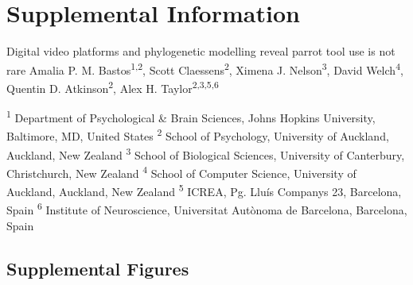 \documentclass[
  man, donotrepeattitle,floatsintext]{apa6}
\begin{document}
\renewcommand{\figurename}{Figure}
\renewcommand{\tablename}{Table}
\renewcommand{\thefigure}{S\arabic{figure}} \setcounter{figure}{0}
\renewcommand{\thetable}{S\arabic{table}} \setcounter{table}{0}
\renewcommand{\theequation}{S\arabic{equation}} \setcounter{equation}{0}

\hypertarget{supplemental-information}{%
\section{\texorpdfstring{\textbf{Supplemental Information}}{Supplemental Information}}\label{supplemental-information}}

\setcounter{page}{1}
\centering

\noindent \hspace*{5mm} \small Digital video platforms and phylogenetic modelling reveal parrot tool use is not rare \newline
\hspace*{1cm} \small Amalia P. M. Bastos\textsuperscript{1,2}, Scott Claessens\textsuperscript{2}, Ximena J. Nelson\textsuperscript{3}, David Welch\textsuperscript{4}, \newline
\hspace*{25mm} Quentin D. Atkinson\textsuperscript{2}, Alex H. Taylor\textsuperscript{2,3,5,6} \newline

\raggedright

\noindent \footnotesize \textsuperscript{1} Department of Psychological \& Brain Sciences, Johns Hopkins University, Baltimore, MD, United States \newline
\noindent \footnotesize \textsuperscript{2} School of Psychology, University of Auckland, Auckland, New Zealand \newline
\noindent \footnotesize \textsuperscript{3} School of Biological Sciences, University of Canterbury, Christchurch, New Zealand \newline
\noindent \footnotesize \textsuperscript{4} School of Computer Science, University of Auckland, Auckland, New Zealand \newline
\noindent \footnotesize \textsuperscript{5} ICREA, Pg. Lluís Companys 23, Barcelona, Spain \newline
\noindent \footnotesize \textsuperscript{6} Institute of Neuroscience, Universitat Autònoma de Barcelona, Barcelona, Spain \newline
\normalsize
\newpage

\hypertarget{supplemental-figures}{%
\subsection{Supplemental Figures}\label{supplemental-figures}}
\end{document}
